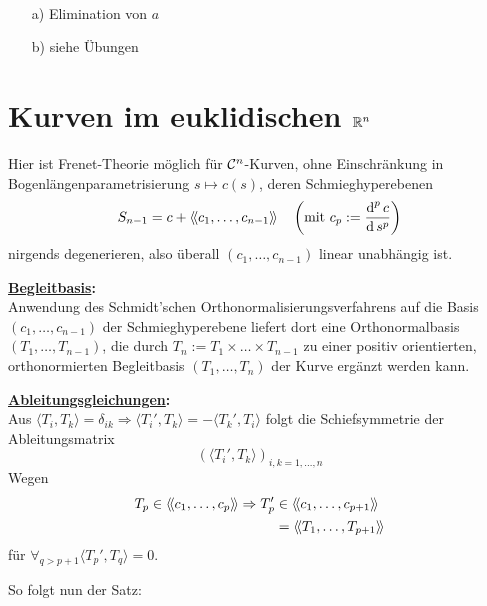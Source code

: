 \begin{beweis} \(\)
 \begin{enumerate}
  \item[a)] Elimination von \(a\)
  \item[b)] siehe Übungen
 \end{enumerate}

\end{beweis}

\section{Kurven im euklidischen $\mathbb{R}^n$}
Hier ist Frenet-Theorie möglich für \(\mathcal{C}^n\)-Kurven, ohne Einschränkung in Bogenlängenparametrisierung \(s \mapsto c(s)\), deren Schmieghyperebenen
\[
 S_{n-1} = c + \left\langle\!\left\langle c_1, \dots, c_{n-1} \right\rangle\!\right\rangle \quad \left(\text{mit } c_p := \frac{\operatorname{d}^p c}{\operatorname{d} s^p}\right)
\]
nirgends degenerieren, also überall \((c_1, \dots, c_{n-1})\) linear unabhängig ist.

\textbf{\uline{Begleitbasis}:} \\
Anwendung des Schmidt'schen Orthonormalisierungsverfahrens auf die Basis \((c_1, \dots, c_{n-1})\) der Schmieghyperebene liefert dort eine Orthonormalbasis \((T_1, \dots, T_{n-1})\), die durch \(T_n := T_1 \times \dots \times T_{n-1}\) zu einer positiv orientierten, orthonormierten Begleitbasis \((T_1, \dots, T_n)\) der Kurve ergänzt werden kann. \par
\textbf{\uline{Ableitungsgleichungen}:} \\
Aus \(\langle T_i, T_k\rangle = \delta_{ik} \Rightarrow \langle T_i', T_k\rangle = -\langle T_k', T_i \rangle\) folgt die Schiefsymmetrie der Ableitungsmatrix \[\left( \langle T_i', T_k\rangle \right)_{i,k = 1, \dots, n}\]
Wegen 
\begin{align*}
T_p \in \left\langle\!\left\langle c_1, \dots, c_p \right\rangle\!\right\rangle \Rightarrow T_p' &\in \left\langle\!\left\langle c_1, \dots, c_{p+1} \right\rangle\!\right\rangle \\
&= \left\langle\!\left\langle T_1, \dots, T_{p+1}\right\rangle\!\right\rangle
\end{align*}
für \(\forall_{q > p+1} \langle T_p', T_q\rangle = 0\). \par
So folgt nun der Satz:


